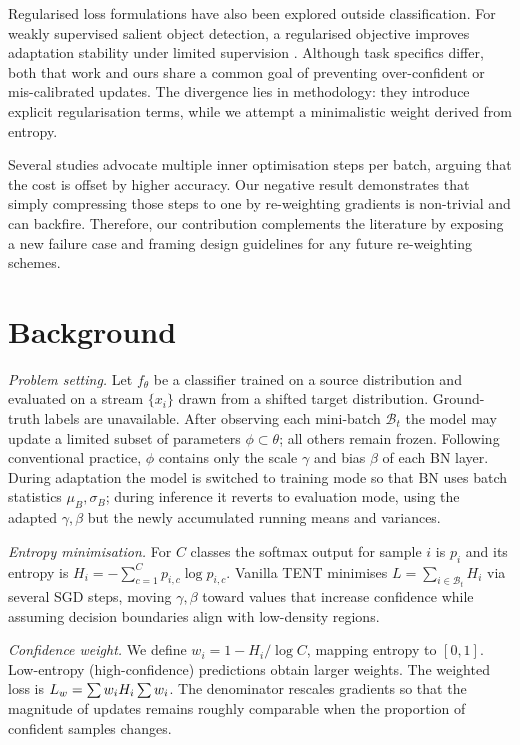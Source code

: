 \documentclass{article} %
\begin{document}
Regularised loss formulations have also been explored outside classification. For weakly supervised salient object detection, a regularised objective improves adaptation stability under limited supervision \cite{author-year-test}. Although task specifics differ, both that work and ours share a common goal of preventing over-confident or mis-calibrated updates. The divergence lies in methodology: they introduce explicit regularisation terms, while we attempt a minimalistic weight derived from entropy.

Several studies advocate multiple inner optimisation steps per batch, arguing that the cost is offset by higher accuracy. Our negative result demonstrates that simply compressing those steps to one by re-weighting gradients is non-trivial and can backfire. Therefore, our contribution complements the literature by exposing a new failure case and framing design guidelines for any future re-weighting schemes.

\section{Background}
\label{sec:background}
\textit{Problem setting.} Let \(f_{\theta}\) be a classifier trained on a source distribution and evaluated on a stream \(\{x_i\}\) drawn from a shifted target distribution. Ground-truth labels are unavailable. After observing each mini-batch \(\mathcal{B}_t\) the model may update a limited subset of parameters \(\phi \subset \theta\); all others remain frozen. Following conventional practice, \(\phi\) contains only the scale \(\gamma\) and bias \(\beta\) of each BN layer. During adaptation the model is switched to training mode so that BN uses batch statistics \(\mu_{B}, \sigma_{B}\); during inference it reverts to evaluation mode, using the adapted \(\gamma, \beta\) but the newly accumulated running means and variances.

\textit{Entropy minimisation.} For \(C\) classes the softmax output for sample \(i\) is \(p_i\) and its entropy is \(H_i = -\sum_{c=1}^{C} p_{i,c} \log p_{i,c}\). Vanilla TENT minimises \(L = \sum_{i\in\mathcal{B}_t} H_i\) via several SGD steps, moving \(\gamma, \beta\) toward values that increase confidence while assuming decision boundaries align with low-density regions.

\textit{Confidence weight.} We define \(w_i = 1 - H_i / \log C\), mapping entropy to \([0,1]\). Low-entropy (high-confidence) predictions obtain larger weights. The weighted loss is \(L_{w} = \sum w_i H_i \/ \sum w_i\). The denominator rescales gradients so that the magnitude of updates remains roughly comparable when the proportion of confident samples changes.
\end{document}
